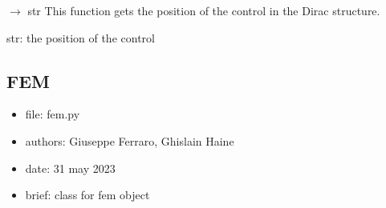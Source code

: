 \documentclass[letterpaper,10pt,english]{sphinxmanual}
\begin{document}
\begin{fulllineitems}
\begin{fulllineitems}
\begin{description}
\end{description}

\end{fulllineitems}


\begin{fulllineitems}
\label{\detokenize{scrimp:scrimp.control.Control_Port.get_position}}
\pysigstartsignatures
\pysiglinewithargsret
{}
{}
{{ $\rightarrow$ str}}
\pysigstopsignatures
\sphinxAtStartPar
This function gets the position of the control in the Dirac structure.
\begin{description}
\sphinxAtStartPar
str: the position of the control

\end{description}

\end{fulllineitems}


\end{fulllineitems}



\subsection{FEM}
\label{\detokenize{scrimp:module-scrimp.fem}}\label{\detokenize{scrimp:fem}}\begin{itemize}
\item {} 
\sphinxAtStartPar
file:             fem.py

\item {} 
\sphinxAtStartPar
authors:          Giuseppe Ferraro, Ghislain Haine

\item {} 
\sphinxAtStartPar
date:             31 may 2023

\item {} 
\sphinxAtStartPar
brief:            class for fem object

\end{itemize}
\end{document}
